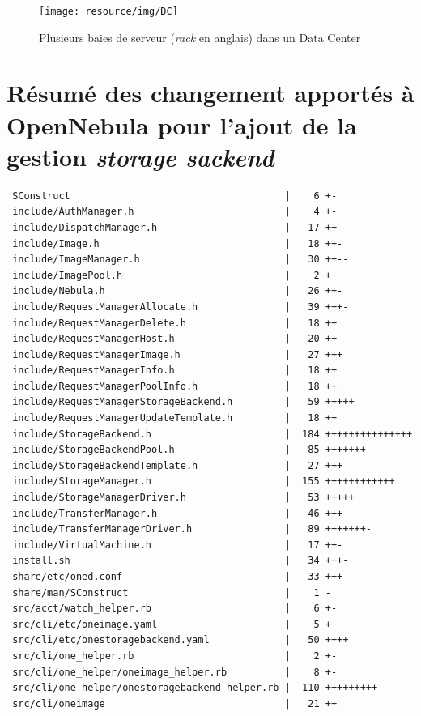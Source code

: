 \begin{figure}[H]
	\centering
	\texttt{[image: resource/img/DC]}
	\caption{Plusieurs baies de serveur (\emph{rack} en anglais) dans un Data Center}
	\label{datacenter}
\end{figure}

\chapter{Résumé des changement apportés à OpenNebula pour l'ajout de la gestion \emph{storage sackend}}
\label{modopennebula}
\begin{lstlisting}
 SConstruct                                     |    6 +-
 include/AuthManager.h                          |    4 +-
 include/DispatchManager.h                      |   17 ++-
 include/Image.h                                |   18 ++-
 include/ImageManager.h                         |   30 ++--
 include/ImagePool.h                            |    2 +
 include/Nebula.h                               |   26 ++-
 include/RequestManagerAllocate.h               |   39 +++-
 include/RequestManagerDelete.h                 |   18 ++
 include/RequestManagerHost.h                   |   20 ++
 include/RequestManagerImage.h                  |   27 +++
 include/RequestManagerInfo.h                   |   18 ++
 include/RequestManagerPoolInfo.h               |   18 ++
 include/RequestManagerStorageBackend.h         |   59 +++++
 include/RequestManagerUpdateTemplate.h         |   18 ++
 include/StorageBackend.h                       |  184 +++++++++++++++
 include/StorageBackendPool.h                   |   85 +++++++
 include/StorageBackendTemplate.h               |   27 +++
 include/StorageManager.h                       |  155 ++++++++++++
 include/StorageManagerDriver.h                 |   53 +++++
 include/TransferManager.h                      |   46 +++--
 include/TransferManagerDriver.h                |   89 +++++++-
 include/VirtualMachine.h                       |   17 ++-
 install.sh                                     |   34 +++-
 share/etc/oned.conf                            |   33 +++-
 share/man/SConstruct                           |    1 -
 src/acct/watch_helper.rb                       |    6 +-
 src/cli/etc/oneimage.yaml                      |    5 +
 src/cli/etc/onestoragebackend.yaml             |   50 ++++
 src/cli/one_helper.rb                          |    2 +-
 src/cli/one_helper/oneimage_helper.rb          |    8 +-
 src/cli/one_helper/onestoragebackend_helper.rb |  110 +++++++++
 src/cli/oneimage                               |   21 ++

\end{lstlisting}
